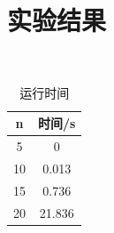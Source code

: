 \documentclass[10pt,letterpaper]{ctexart}
\begin{document}
\section{实验结果}
\begin{figure}[H]
  \centering
  \\
\end{figure}

\begin{table}[!htbp]
  \centering
  \begin{tabular}{cc}
    \toprule
    n & 时间/s\\
    \midrule
    5 & 0\\
    10 & 0.013\\
    15 & 0.736\\
    20 & 21.836\\
    \bottomrule
  \end{tabular}
  \caption{运行时间}
\end{table}
\end{document}
